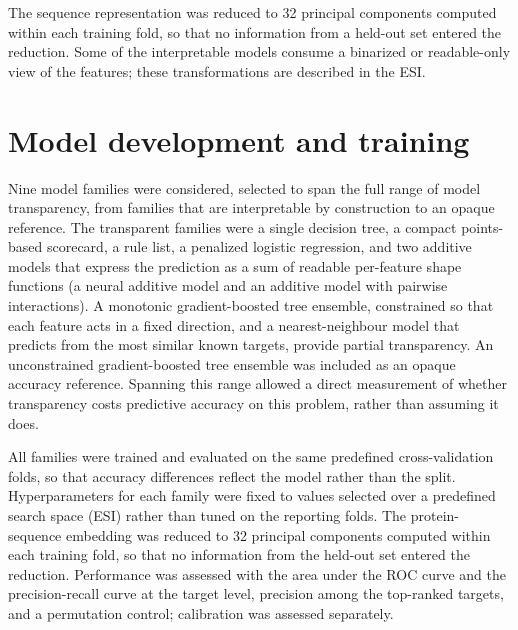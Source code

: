 \documentclass[11pt,twocolumn]{article}
\begin{document}
The sequence representation was reduced to 32 principal components computed within each training fold, so that no information from a held-out set entered the reduction. Some of the interpretable models consume a binarized or readable-only view of the features; these transformations are described in the ESI.

\section{Model development and training}

Nine model families were considered, selected to span the full range of model transparency, from families that are interpretable by construction to an opaque reference. The transparent families were a single decision tree, a compact points-based scorecard, a rule list,\cite{ref54} a penalized logistic regression,\cite{ref55} and two additive models that express the prediction as a sum of readable per-feature shape functions (a neural additive model and an additive model with pairwise interactions). A monotonic gradient-boosted tree ensemble, constrained so that each feature acts in a fixed direction, and a nearest-neighbour model that predicts from the most similar known targets,\cite{ref56} provide partial transparency. An unconstrained gradient-boosted tree ensemble was included as an opaque accuracy reference.\cite{ref57} Spanning this range allowed a direct measurement of whether transparency costs predictive accuracy on this problem, rather than assuming it does.

All families were trained and evaluated on the same predefined cross-validation folds, so that accuracy differences reflect the model rather than the split. Hyperparameters for each family were fixed to values selected over a predefined search space (ESI) rather than tuned on the reporting folds. The protein-sequence embedding was reduced to 32 principal components computed within each training fold, so that no information from the held-out set entered the reduction. Performance was assessed with the area under the ROC curve and the precision-recall curve at the target level, precision among the top-ranked targets, and a permutation control; calibration was assessed separately.
\end{document}
